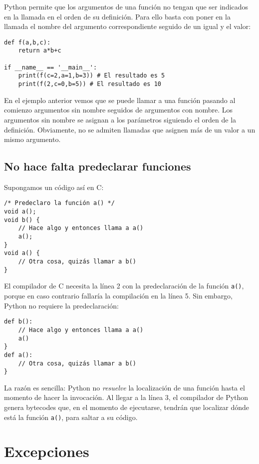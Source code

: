 Python permite que los argumentos de una función no tengan que ser indicados en la llamada en el orden de su definición. Para ello basta con poner en la llamada el nombre del argumento correspondiente seguido de un igual y el valor:

\begin{lstlisting}
def f(a,b,c):
    return a*b+c

if __name__ == '__main__':
    print(f(c=2,a=1,b=3)) # El resultado es 5
    print(f(2,c=0,b=5)) # El resultado es 10
\end{lstlisting}


En el ejemplo anterior vemos que se puede llamar a una función pasando al comienzo argumentos sin nombre seguidos de argumentos con nombre. Los argumentos sin nombre se asignan a los parámetros siguiendo el orden de la definición. Obviamente, no se admiten llamadas que asignen más de un valor a un mismo argumento.

\subsection{No hace falta predeclarar funciones}

Supongamos un código así en C:

\begin{lstlisting}
/* Predeclaro la función a() */
void a();
void b() {
    // Hace algo y entonces llama a a()
    a();
}
void a() {
    // Otra cosa, quizás llamar a b()
}
\end{lstlisting}

El compilador de C necesita la línea 2 con la predeclaración de la función \texttt{a()}, porque en caso contrario fallaría la compilación en la línea 5. Sin embargo, Python no requiere la predeclaración:

\begin{lstlisting}
def b():
    // Hace algo y entonces llama a a()
    a()
}
def a():
    // Otra cosa, quizás llamar a b()
}
\end{lstlisting}

La razón es sencilla: Python no \emph{resuelve} la localización de una función hasta el momento de hacer la invocación. Al llegar a la línea 3, el compilador de Python genera bytecodes que, en el momento de ejecutarse, tendrán que localizar dónde está la función \texttt{a()}, para saltar a su código.


\section{Excepciones}


